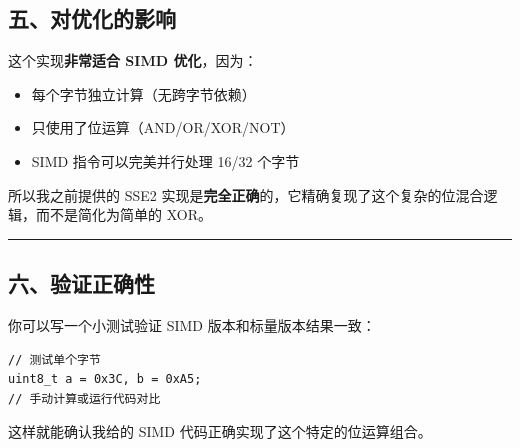 \documentclass[11pt, a4paper]{article}
\begin{document}
\begin{aibox}
\subsection*{五、对优化的影响}

这个实现\textbf{非常适合 SIMD 优化}，因为：
\begin{itemize}
    \item 每个字节独立计算（无跨字节依赖）
    \item 只使用了位运算（AND/OR/XOR/NOT）
    \item SIMD 指令可以完美并行处理 16/32 个字节
\end{itemize}

所以我之前提供的 SSE2 实现是\textbf{完全正确}的，它精确复现了这个复杂的位混合逻辑，而不是简化为简单的 XOR。

\begin{center}\rule{\textwidth}{0.4pt}\end{center}

\subsection*{六、验证正确性}

你可以写一个小测试验证 SIMD 版本和标量版本结果一致：

\begin{tcolorbox}[colback=white,colframe=gray!50!white,boxrule=0.5pt,arc=2pt,left=5pt,right=5pt,top=5pt,bottom=5pt]
\begin{verbatim}
// 测试单个字节
uint8_t a = 0x3C, b = 0xA5;
// 手动计算或运行代码对比
\end{verbatim}
\end{tcolorbox}

这样就能确认我给的 SIMD 代码正确实现了这个特定的位运算组合。
\end{aibox}

\vspace{1.5em}
\end{document}
